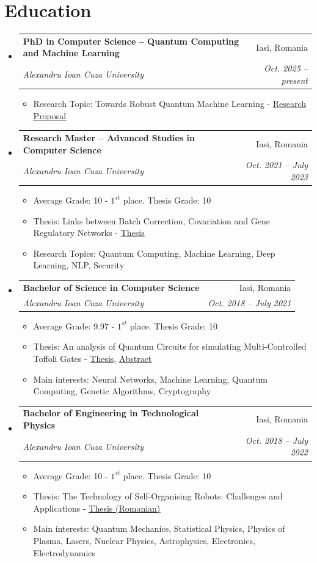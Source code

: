 \documentclass[letterpaper,11pt]{article}
\makeatletter
\newcommand{\resumeItem}[1]{
  \item\small{
    {#1 \vspace{-2pt}}
  }
}
\newcommand{\resumeSubheading}[4]{
  \vspace{-2pt}\item
    \begin{tabular*}{0.97\textwidth}[t]{l@{\extracolsep{\fill}}r}
      \textbf{#1} & #2 \\
      \textit{\small#3} & \textit{\small #4} \\
    \end{tabular*}\vspace{-7pt}
}
\newcommand{\resumeSubHeadingListStart}{\begin{itemize}[leftmargin=0.15in, label={}]}
\newcommand{\resumeSubHeadingListEnd}{\end{itemize}}
\newcommand{\resumeItemListStart}{\begin{itemize}}
\newcommand{\resumeItemListEnd}{\end{itemize}\vspace{-5pt}}
\makeatother
\begin{document}
\section{Education}
  \resumeSubHeadingListStart
    \resumeSubheading
      {PhD in Computer Science -- Quantum Computing and Machine Learning}{Iasi, Romania}
      {Alexandru Ioan Cuza University}{Oct. 2025 -- present}
      \resumeItemListStart
         \resumeItem{Research Topic: Towards Robust Quantum Machine Learning - \href{https://drive.google.com/file/d/16m703g77aiTLwUbUyto-ndqs7kgG5L61/view?usp=sharing}{\underline{Research Proposal}} }
      \resumeItemListEnd
    \resumeSubheading
      {Research Master -- Advanced Studies in Computer Science}{Iasi, Romania}{Alexandru Ioan Cuza University}
      {Oct. 2021 -- July 2023}
      \resumeItemListStart
        \resumeItem{Average Grade: 10 - $1^{st}$ place. Thesis Grade: 10}
         \resumeItem{Thesis: Links between Batch Correction, Covariation and Gene Regulatory Networks - \href{https://drive.google.com/file/d/1BzjoTSXKUYOVdDC3eJaiBNf7gpcTsWTL/view?usp=sharing}{\underline{Thesis}} }
        \resumeItem{Research Topics: Quantum Computing, Machine Learning, Deep Learning, NLP, Security}
      \resumeItemListEnd
    \resumeSubheading
      {Bachelor of Science in Computer Science}{Iasi, Romania}{Alexandru Ioan Cuza University}
      {Oct. 2018 -- July 2021}
      \resumeItemListStart
        \resumeItem{Average Grade: 9.97 - $1^{st}$ place. Thesis Grade: 10}
         \resumeItem{Thesis: An analysis of Quantum Circuits for simulating Multi-Controlled Toffoli Gates - \href{https://drive.google.com/file/d/1p6OVt32taV5ck82k2D3_9zv4dX4lRJDI/view?usp=sharing}{\underline{Thesis}}, \href{https://drive.google.com/file/d/1DEUZwrW98wki1-3jgFVsGpCBbvJb0egk/view?usp=sharing}{\underline{Abstract}} }
        \resumeItem{Main interests: Neural Networks, Machine Learning, Quantum Computing, Genetic Algorithms, Cryptography}
      \resumeItemListEnd
    \resumeSubheading
      {Bachelor of Engineering in Technological Physics}{Iasi, Romania}{Alexandru Ioan Cuza University}
      {Oct. 2018 -- July 2022}
      \resumeItemListStart
        \resumeItem{Average Grade: 10 - $1^{st}$ place. Thesis Grade: 10}
        \resumeItem{Thesis: The Technology of Self-Organising Robots: Challenges and Applications - \href{https://drive.google.com/file/d/1kVGjyk2jG-dpeKHYZyFaBgVIT5xgHNoc/view?usp=sharing}{\underline{Thesis (Romanian)}} }
        \resumeItem{Main interests: Quantum Mechanics, Statistical Physics, Physics of Plasma, Lasers, Nuclear Physics, Astrophysics, Electronics, Electrodynamics}
      \resumeItemListEnd
  \resumeSubHeadingListEnd
\end{document}
